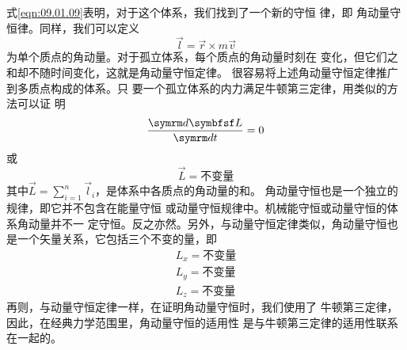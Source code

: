 式\eqref{eqn:09.01.09}表明，对于这个体系，我们找到了一个新的守恒
律，即
角动量守恒律。同样，我们可以定义
\begin{equation}\label{eqn:09.01.10}
  \vec{l} = \vec{r} \times m \vec{v}
\end{equation}
为单个质点的角动量。对于孤立体系，每个质点的角动量时刻在
变化，但它们之和却不随时间变化，这就是角动量守恒定律。
很容易将上述角动量守恒定律推广到多质点构成的体系。只
要一个孤立体系的内力满足牛顿第三定律，用类似的方法可以证
明
\begin{equation*}
  \frac { \dif \vec{L} } { \dif t } = 0
\end{equation*}
或%
\begin{equation}\label{eqn:09.01.11}
  \vec{L}=\text{不变量}
\end{equation}
其中$\displaystyle \vec{L}=\sum_{i=1}^{n} \vec{l}_i$，是体系中各质点的角动量的和。
角动量守恒也是一个独立的规律，即它并不包含在能量守恒
或动量守恒规律中。机械能守恒或动量守恒的体系角动量并不一
定守恒。反之亦然。另外，与动量守恒定律类似，角动量守恒也
是一个矢量关系，它包括三个不变的量，即
\begin{equation}\label{eqn:09.01.12}
  \begin{aligned}
    L _ { x } = \text{不变量} \\
    L _ { y } = \text{不变量} \\
    L _ { z } = \text{不变量}
  \end{aligned}
\end{equation}
再则，与动量守恒定律一样，在证明角动量守恒时，我们使用了
牛顿第三定律，因此，在经典力学范围里，角动量守恒的适用性
是与牛顿第三定律的适用性联系在一起的。